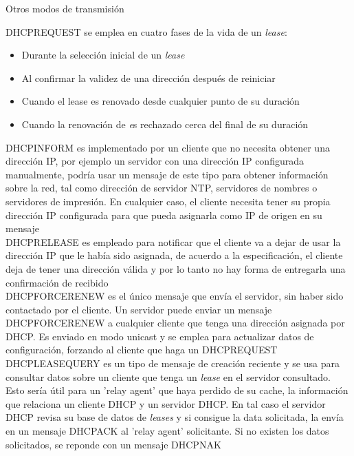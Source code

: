 \begin{frame}{Otros modos de transmisión}

    DHCPREQUEST se emplea en cuatro fases de la vida de un \textit{lease}:

    \begin{itemize}
        \item Durante la selección inicial de un \textit{lease}
        \item Al confirmar la validez de una dirección después de reiniciar
        \item Cuando el lease es renovado desde cualquier punto de su duración
        \item Cuando la renovación de \textit es rechazado cerca del final de
        su duración\\[0.2cm]
    \end{itemize}

    DHCPINFORM es implementado por un cliente que no necesita obtener una
    dirección IP, por ejemplo un servidor con una dirección IP configurada
    manualmente, podría usar un mensaje de este tipo para obtener información
    sobre la red, tal como dirección de servidor NTP, servidores de nombres o
    servidores de impresión. En cualquier caso, el cliente necesita tener su
    propia dirección IP configurada para que pueda asignarla como IP de origen
    en su mensaje\\[0.2cm]

    DHCPRELEASE es empleado para notificar que el cliente va a dejar de usar la
    dirección IP que le había sido asignada, de acuerdo a la especificación, el
    cliente deja de tener una dirección válida y por lo tanto no hay forma de
    entregarla una confirmación de recibido\\[0.2cm]

    DHCPFORCERENEW es el único mensaje que envía el servidor, sin haber sido
    contactado por el cliente. Un servidor puede enviar un mensaje
    DHCPFORCERENEW a cualquier cliente que tenga una dirección asignada por
    DHCP. Es enviado en modo unicast y se emplea para actualizar datos de
    configuración, forzando al cliente que haga un DHCPREQUEST\\[0.2cm]
    
    DHCPLEASEQUERY es un tipo de mensaje de creación reciente y se usa para
    consultar datos sobre un cliente que tenga un \textit{lease} en el servidor
    consultado. Esto sería útil para un 'relay agent' que haya perdido de su
    cache, la información que relaciona un cliente DHCP y un servidor DHCP. En
    tal caso el servidor DHCP revisa su base de datos de \textit{leases} y si
    consigue la data solicitada, la envía en un mensaje DHCPACK al 'relay
    agent' solicitante. Si no existen los datos solicitados, se reponde con un
    mensaje DHCPNAK\\[0.2cm]

\end{frame}

